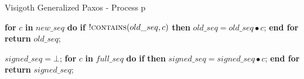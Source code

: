 \begin{algorithm}
	\caption{Visigoth Generalized Paxos - Process p}
	\begin{algorithmic}[1]
		
		\State \textbf{for} $c$ \textbf{in} $new\_seq$ \textbf{do} 
		\State \hspace{\algorithmicindent} \textbf{if} $!\Call{contains}{old\_seq,c}$ \textbf{then}
		\State \hspace{\algorithmicindent}\hspace{\algorithmicindent}\hspace{\algorithmicindent} $old\_seq =  old\_seq \bullet c$;
		\State \textbf{end for}
		\State \textbf{return} $old\_seq$;
		\EndFunction
		
		\State
		\State $signed\_seq = \bot$;
		\State \textbf{for} $c$ \textbf{in} $full\_seq$ \textbf{do}
		\State \hspace{\algorithmicindent} \textbf{if}  \textbf{then}
		\State \hspace{\algorithmicindent}\hspace{\algorithmicindent} $signed\_seq = signed\_seq \bullet c$;
		\State \textbf{end for}
		\State \textbf{return} $signed\_seq$;
		\EndFunction
	\end{algorithmic}
\end{algorithm}


